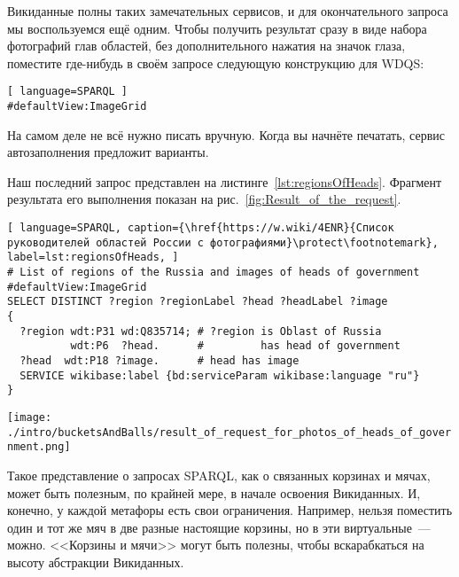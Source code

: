 Викиданные полны таких замечательных сервисов, и для окончательного запроса мы воспользуемся ещё одним. Чтобы получить результат сразу в виде набора фотографий глав областей, без дополнительного нажатия на значок глаза, поместите где-нибудь в своём запросе следующую конструкцию для WDQS:
\begin{lstlisting}[ language=SPARQL ]
#defaultView:ImageGrid
\end{lstlisting}

На самом деле не всё нужно писать вручную. Когда вы начнёте печатать, сервис автозаполнения предложит варианты.

Наш последний запрос представлен на листинге~\ref{lst:regionsOfHeads}. Фрагмент результата его выполнения показан на рис.~\ref{fig:Result_of_the_request}.

\lstset{numbers=left, firstnumber=1, frame=single}
\begin{lstlisting}[ language=SPARQL, caption={\href{https://w.wiki/4ENR}{Список руководителей областей России с фотографиями}\protect\footnotemark}, label=lst:regionsOfHeads, ]
# List of regions of the Russia and images of heads of government
#defaultView:ImageGrid
SELECT DISTINCT ?region ?regionLabel ?head ?headLabel ?image
{
  ?region wdt:P31 wd:Q835714; # ?region is Oblast of Russia
          wdt:P6  ?head.      #         has head of government
  ?head  wdt:P18 ?image.      # head has image
  SERVICE wikibase:label {bd:serviceParam wikibase:language "ru"} 
}
\end{lstlisting}


\begin{figure*}[h!]
\texttt{[image: ./intro/bucketsAndBalls/result\_of\_request\_for\_photos\_of\_heads\_of\_government.png]}
\caption{Результат запроса в виде сетки изображений.}
\label{fig:Result_of_the_request}
\end{figure*}


Такое представление о запросах SPARQL, как о связанных корзинах и мячах, может быть полезным, по крайней мере, в начале освоения Викиданных. И, конечно, у каждой метафоры есть свои ограничения. Например, нельзя поместить один и тот же мяч в две разные настоящие корзины, но в эти виртуальные~--- можно. <<Корзины и мячи>> могут быть полезны, чтобы вскарабкаться на высоту абстракции Викиданных.
